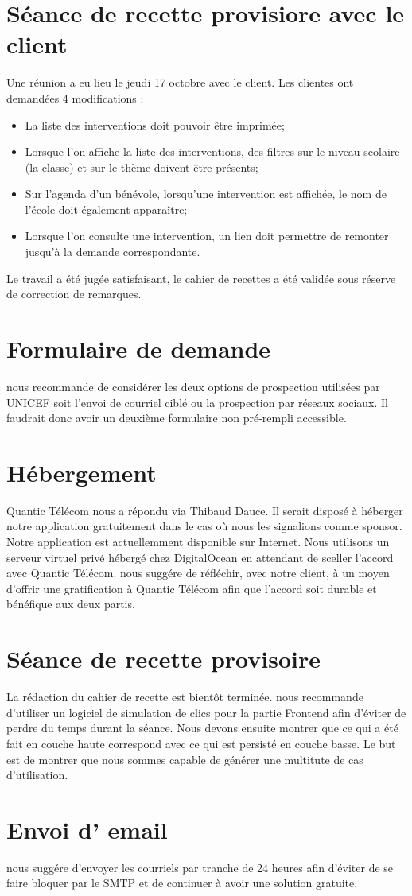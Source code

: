\documentclass [a4paper] {article}
\begin{document}
\section{Séance de recette provisiore avec le client}
Une réunion a eu lieu le jeudi 17 octobre avec le client. Les clientes ont demandées 4 modifications : 
\begin{itemize}
	\item	La liste des interventions doit pouvoir être imprimée;
	\item	Lorsque l'on affiche la liste des interventions, des filtres sur le niveau scolaire (la classe) et sur le thème doivent être présents;
	\item	Sur l'agenda d'un bénévole, lorsqu'une intervention est affichée, le nom de l'école doit également apparaître;
	\item	Lorsque l'on consulte une intervention, un lien doit permettre de remonter jusqu'à la demande correspondante.
\end{itemize} 
Le travail a été jugée satisfaisant, le cahier de recettes a été validée sous réserve de correction de remarques.

\section{Formulaire de demande}
\nomTuteurPedago{} nous recommande de considérer les deux options de prospection utilisées par UNICEF soit l'envoi de courriel ciblé ou la prospection par réseaux sociaux. 
Il faudrait donc avoir un deuxième formulaire non pré-rempli accessible.

\section{Hébergement}
Quantic Télécom nous a répondu via Thibaud Dauce. Il serait disposé à héberger notre application gratuitement dans le cas où nous les signalions comme sponsor. Notre application est actuellemment disponible sur Internet. Nous utilisons un serveur virtuel privé hébergé chez DigitalOcean en attendant de sceller l'accord avec Quantic Télécom. \nomTuteurPedago{} nous suggére de réfléchir, avec notre client, à un moyen d'offrir une gratification à Quantic Télécom afin que l'accord soit durable et bénéfique aux deux partis.

\section{Séance de recette provisoire}
La rédaction du cahier de recette est bientôt terminée. \nomTuteurPedago{} nous recommande d'utiliser un logiciel de simulation de clics pour la partie Frontend afin d'éviter de perdre du temps durant la séance. Nous devons ensuite montrer que ce qui a été fait en couche haute correspond avec ce qui est persisté en couche basse. Le but est de montrer que nous sommes capable de générer une multitute de cas d'utilisation.

\section{Envoi d' email}
\nomTuteurPedago{} nous suggére d'envoyer les courriels par tranche de 24 heures afin d'éviter de se faire bloquer par le SMTP et de continuer à avoir une solution gratuite.
\newpage
\end{document}
